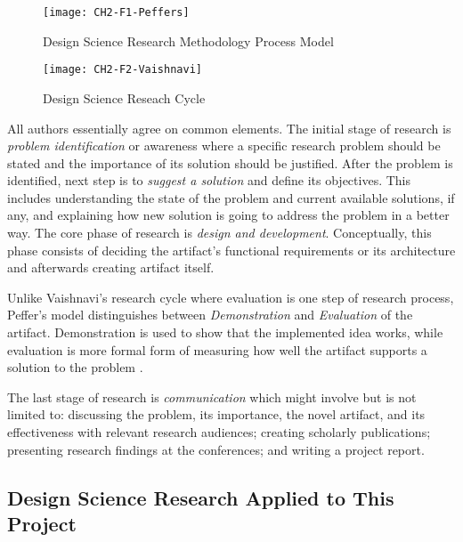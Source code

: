 \begin{figure}[h!]
\centering
\texttt{[image: CH2-F1-Peffers]}
\caption[Design Science Research Methodology Process Model]{Design Science
Research Methodology Process Model \citep{Peffers2008}}
\label{fig:peffers}
\end{figure}

\FloatBarrier

\begin{figure}[htp]
\centering
\texttt{[image: CH2-F2-Vaishnavi]}
\caption[Design Science Reseach Cycle]{Design Science Reseach Cycle \citep{Vaishnavi2007}}
\label{fig:vaishnavi}
\end{figure}

\FloatBarrier

All authors essentially agree on common elements. The initial stage of research
is \textit{problem identification} or awareness where a specific research
problem should be stated and the importance of its solution should be justified.
After the problem is identified, next step is to \textit{suggest a solution} and
define its objectives. This includes understanding the state of the problem and
current available solutions, if any, and explaining how new solution is going to
address the problem in a better way. The core phase of research is
\textit{design and development}. Conceptually, this phase consists of deciding
the artifact's functional requirements or its architecture and afterwards
creating artifact itself.

Unlike Vaishnavi's research cycle where evaluation is one step of research
process, Peffer's model distinguishes between \textit{Demonstration} and
\textit{Evaluation} of the artifact. Demonstration is used to show that the
implemented idea works, while evaluation is more formal form of measuring how
well the artifact supports a solution to the problem \citep{Peffers2008}.

The last stage of research is \textit{communication} which might involve but is
not limited to: discussing the problem, its importance, the novel artifact, and
its effectiveness with relevant research audiences; creating scholarly
publications; presenting research findings at the conferences; and writing a
project report.

\subsection{Design Science Research Applied to This Project}

